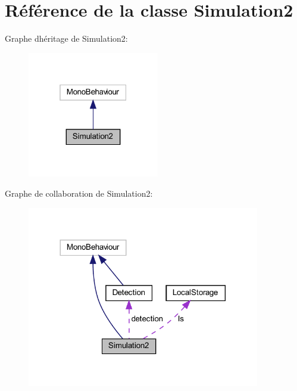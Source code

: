 \hypertarget{class_simulation2}{}\section{Référence de la classe Simulation2}
\label{class_simulation2}


Graphe d\textquotesingle{}héritage de Simulation2\+:\nopagebreak
\begin{figure}[H]
\begin{center}
\leavevmode
\includegraphics[width=163pt]{class_simulation2__inherit__graph}
\end{center}
\end{figure}


Graphe de collaboration de Simulation2\+:
\nopagebreak
\begin{figure}[H]
\begin{center}
\leavevmode
\includegraphics[width=288pt]{class_simulation2__coll__graph}
\end{center}
\end{figure}
